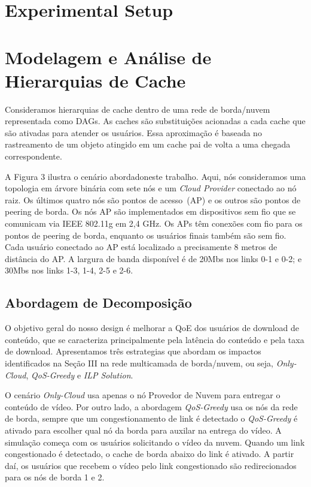 \section{Experimental Setup}
\label{sec:experimental-setup}

\section{Modelagem e Análise de Hierarquias de Cache}
\label{sec:mechanism}

Consideramos hierarquias de cache dentro de uma rede de borda/nuvem representada como DAGs. As caches são substituições acionadas a cada cache que são ativadas para atender os usuários. Essa aproximação é baseada no rastreamento de um objeto atingido em um cache pai de volta a uma chegada correspondente.

A Figura 3 ilustra o cenário abordadoneste trabalho. Aqui, nós consideramos uma topologia em árvore binária com sete nós e um \textit{Cloud Provider} conectado ao nó raiz. Os últimos quatro nós são pontos de acesso~(AP) e os outros são pontos de peering de borda. Os nós AP são implementados em dispositivos sem fio que se comunicam via IEEE 802.11g em 2,4 GHz. Os APs têm conexões com fio para os pontos de peering de borda, enquanto os usuários finais também são sem fio. Cada usuário conectado ao AP está localizado a precisamente 8 metros de distância do AP. A largura de banda disponível é de 20Mbs nos links 0-1 e 0-2; e 30Mbs nos links 1-3, 1-4, 2-5 e 2-6.

\subsection{Abordagem de Decomposição}

O objetivo geral do nosso design é melhorar a QoE dos usuários de download de conteúdo, que se caracteriza principalmente pela latência do conteúdo e pela taxa de download. 
Apresentamos três estrategias que abordam os impactos identificados na Seção III na rede multicamada de borda/nuvem, ou seja, \textit{Only-Cloud}, \textit{QoS-Greedy} e \textit{ILP Solution}. 

O cenário \textit{Only-Cloud} usa apenas o nó Provedor de Nuvem para entregar o conteúdo de vídeo. Por outro lado, a abordagem \textit{QoS-Greedy} usa os nós da rede de borda, sempre que um congestionamento de link é detectado o \textit{QoS-Greedy} é ativado para escolher qual nó da borda para auxilar na entrega do vídeo.   A simulação começa com os usuários solicitando o vídeo da nuvem. Quando um link congestionado é detectado, o cache de borda abaixo do link é ativado. A partir daí, os usuários que recebem o vídeo pelo link congestionado são redirecionados para os nós de borda 1 e 2.


